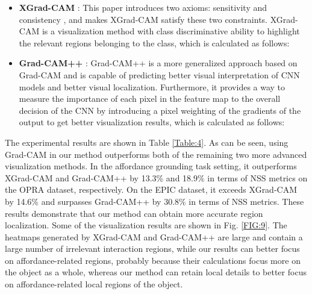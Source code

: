 \documentclass[journal,twoside]{IEEEtran}
\begin{document}
\begin{itemize}

\item []
\textbf{XGrad-CAM }\cite{fu2020axiom}: This paper introduces two axioms: sensitivity \cite{sundararajan2017axiomatic} and consistency \cite{montavon2018methods}, and makes XGrad-CAM satisfy these two constraints. XGrad-CAM is a visualization method with class discriminative ability to highlight the relevant regions belonging to the class, which is calculated as follows:



\item []
\textbf{Grad-CAM++ }\cite{chattopadhay2018grad}: Grad-CAM++ is a more generalized approach based on Grad-CAM and is capable of predicting better visual interpretation of CNN models and better visual localization. Furthermore, it provides a way to measure the importance of each pixel in the feature map to the overall decision of the CNN by introducing a pixel weighting of the gradients of the output to get better visualization results, which is calculated as follows:




\end{itemize}

The experimental results are shown in Table \ref{Table:4}. As can be seen, using Grad-CAM in our method outperforms both of the remaining two more advanced visualization methods. In the affordance grounding task setting, it outperforms XGrad-CAM \cite{fu2020axiom} and Grad-CAM++ \cite{chattopadhay2018grad} by 13.3\% and 18.9\% in terms of NSS \cite{peters2005components} metrics on the OPRA \cite{demo2vec2018cvpr} dataset, respectively. On the EPIC \cite{Damen2018EPICKITCHENS} dataset, it exceeds XGrad-CAM by 14.6\% and surpasses Grad-CAM++ by 30.8\% in terms of NSS metrics. These results demonstrate that our method can obtain more accurate region localization. Some of the visualization results are shown in Fig. \ref{FIG:9}. The heatmaps generated by XGrad-CAM and Grad-CAM++ are large and contain a large number of irrelevant interaction regions, while our results can better focus on affordance-related regions, probably because their calculations focus more on the object as a whole, whereas our method can retain local details to better focus on affordance-related local regions of the object.
\end{document}
